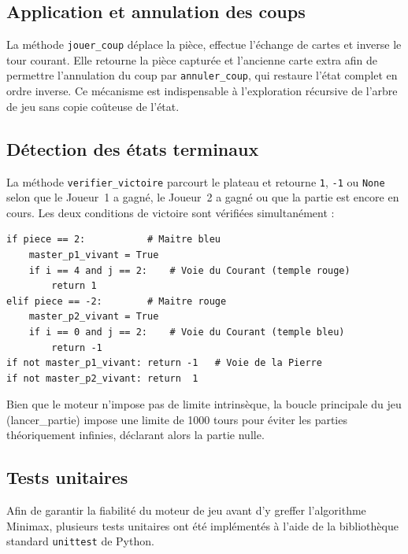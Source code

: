 \documentclass[12pt, a4paper]{article}
\begin{document}

\subsection{Application et annulation des coups}

La méthode \texttt{jouer\_coup} déplace la pièce, effectue l'échange de cartes et inverse
le tour courant. Elle retourne la pièce capturée et l'ancienne carte extra afin de permettre
l'annulation du coup par \texttt{annuler\_coup}, qui restaure l'état complet en ordre inverse.
Ce mécanisme est indispensable à l'exploration récursive de l'arbre de
jeu sans copie coûteuse de l'état.

\subsection{Détection des états terminaux}

La méthode \texttt{verifier\_victoire} parcourt le plateau et retourne \texttt{1}, \texttt{-1}
ou \texttt{None} selon que le Joueur~1 a gagné, le Joueur~2 a gagné ou que la partie est
encore en cours. Les deux conditions de victoire sont vérifiées simultanément :

\begin{lstlisting}[caption={Détection des conditions de victoire.}]
if piece == 2:           # Maitre bleu
    master_p1_vivant = True
    if i == 4 and j == 2:    # Voie du Courant (temple rouge)
        return 1
elif piece == -2:        # Maitre rouge
    master_p2_vivant = True
    if i == 0 and j == 2:    # Voie du Courant (temple bleu)
        return -1
if not master_p1_vivant: return -1   # Voie de la Pierre
if not master_p2_vivant: return  1
\end{lstlisting}

Bien que le moteur n'impose pas de limite intrinsèque, la boucle principale du jeu (lancer\_partie) impose une limite de 1000 tours pour éviter les parties théoriquement infinies, déclarant alors la partie nulle.

\subsection{Tests unitaires}
\label{sec:tests}

Afin de garantir la fiabilité du moteur de jeu avant d'y greffer l'algorithme Minimax,
plusieurs tests unitaires ont été implémentés à l'aide de la bibliothèque standard \texttt{unittest}
de Python. 
\end{document}
